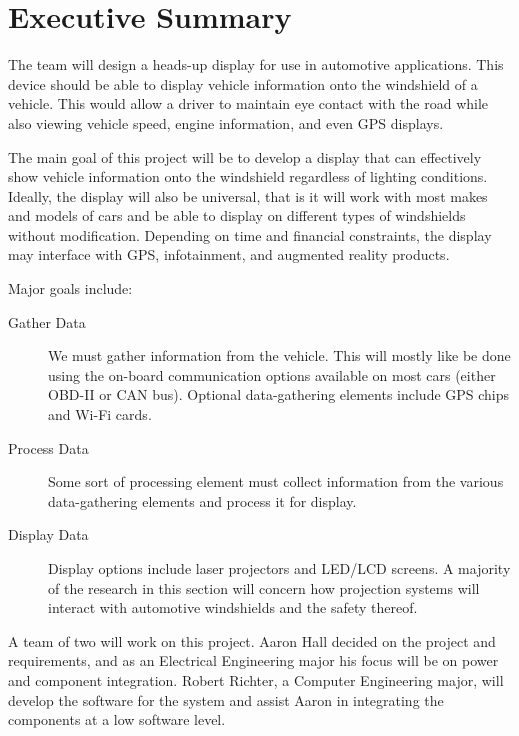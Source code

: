 \section{Executive Summary}

The team will design a heads-up display for use in automotive applications.
This device should be able to display vehicle information onto the
windshield of a vehicle. This would allow a driver to maintain eye contact
with the road while also viewing vehicle speed, engine information, and
even GPS displays.

The main goal of this project will be to develop a display that can
effectively show vehicle information onto the windshield regardless of
lighting conditions. Ideally, the display will also be universal, that is
it will work with most makes and models of cars and be able to display on
different types of windshields without modification. Depending on time and
financial constraints, the display may interface with GPS, infotainment,
and augmented reality products.

Major goals include:

\begin{description}
\item[Gather Data] We must gather information from the vehicle. This will
mostly like be done using the on-board communication options available on
most cars (either OBD-II or CAN bus). Optional data-gathering elements
include GPS chips and Wi-Fi cards.
\item[Process Data]Some sort of processing element must collect information
from the various data-gathering elements and process it for display.
\item[Display Data]Display options include laser projectors and LED/LCD
screens. A majority of the research in this section will concern how
projection systems will interact with automotive windshields and the safety
thereof.
\end{description}

A team of two will work on this project. Aaron Hall decided on the project
and requirements, and as an Electrical Engineering major his focus will be
on power and component integration. Robert Richter, a Computer Engineering
major, will develop the software for the system and assist Aaron in
integrating the components at a low software level.